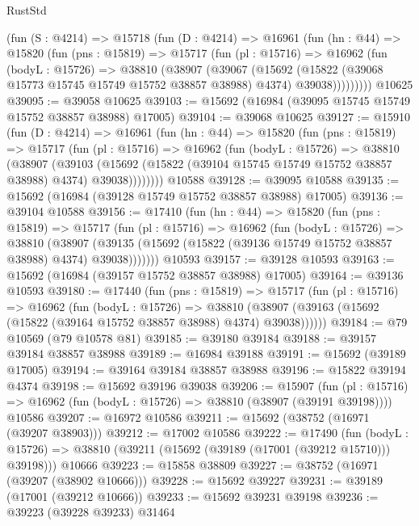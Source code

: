 \begin{lexlean}{RustStd}
\begin{coremodule}
    (fun (S : @4214) =>
    @15718
      (fun (D : @4214) =>
      @16961
        (fun (hn : @44) =>
        @15820
          (fun (pns : @15819) =>
          @15717
            (fun (pl : @15716) =>
            @16962
              (fun (bodyL : @15726) =>
              @38810
                (@38907
                  (@39067
                    (@15692
                      (@15822 (@39068 @15773 @15745 @15749 @15752 @38857 @38988) @4374)
                      @39038)))))))))
    @10625
@39095 := @39058 @10625
@39103 := @15692 (@16984 (@39095 @15745 @15749 @15752 @38857 @38988) @17005)
@39104 := @39068 @10625
@39127 := @15910
    (fun (D : @4214) =>
    @16961
      (fun (hn : @44) =>
      @15820
        (fun (pns : @15819) =>
        @15717
          (fun (pl : @15716) =>
          @16962
            (fun (bodyL : @15726) =>
            @38810
              (@38907
                (@39103
                  (@15692 (@15822 (@39104 @15745 @15749 @15752 @38857 @38988) @4374) @39038))))))))
    @10588
@39128 := @39095 @10588
@39135 := @15692 (@16984 (@39128 @15749 @15752 @38857 @38988) @17005)
@39136 := @39104 @10588
@39156 := @17410
    (fun (hn : @44) =>
    @15820
      (fun (pns : @15819) =>
      @15717
        (fun (pl : @15716) =>
        @16962
          (fun (bodyL : @15726) =>
          @38810
            (@38907
              (@39135 (@15692 (@15822 (@39136 @15749 @15752 @38857 @38988) @4374) @39038)))))))
    @10593
@39157 := @39128 @10593
@39163 := @15692 (@16984 (@39157 @15752 @38857 @38988) @17005)
@39164 := @39136 @10593
@39180 := @17440
    (fun (pns : @15819) =>
    @15717
      (fun (pl : @15716) =>
      @16962
        (fun (bodyL : @15726) =>
        @38810 (@38907 (@39163 (@15692 (@15822 (@39164 @15752 @38857 @38988) @4374) @39038))))))
@39184 := @79 @10569 (@79 @10578 @81)
@39185 := @39180 @39184
@39188 := @39157 @39184 @38857 @38988
@39189 := @16984 @39188
@39191 := @15692 (@39189 @17005)
@39194 := @39164 @39184 @38857 @38988
@39196 := @15822 @39194 @4374
@39198 := @15692 @39196 @39038
@39206 := @15907
    (fun (pl : @15716) => @16962 (fun (bodyL : @15726) => @38810 (@38907 (@39191 @39198))))
    @10586
@39207 := @16972 @10586
@39211 := @15692 (@38752 (@16971 (@39207 @38903)))
@39212 := @17002 @10586
@39222 := @17490
    (fun (bodyL : @15726) => @38810 (@39211 (@15692 (@39189 (@17001 (@39212 @15710))) @39198)))
    @10666
@39223 := @15858 @38809
@39227 := @38752 (@16971 (@39207 (@38902 @10666)))
@39228 := @15692 @39227
@39231 := @39189 (@17001 (@39212 @10666))
@39233 := @15692 @39231 @39198
@39236 := @39223 (@39228 @39233) @31464

\end{coremodule}
\end{lexlean}
